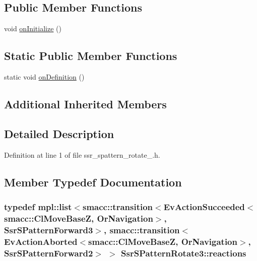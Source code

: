 \subsection*{Public Member Functions}
\begin{DoxyCompactItemize}
\item 
void \hyperlink{structSsrSPatternRotate3_a343a04a297e2b3801e4f7224fa6517a5}{on\+Initialize} ()
\end{DoxyCompactItemize}
\subsection*{Static Public Member Functions}
\begin{DoxyCompactItemize}
\item 
static void \hyperlink{structSsrSPatternRotate3_abd553dc366393f10fb622eb717b92f1b}{on\+Definition} ()
\end{DoxyCompactItemize}
\subsection*{Additional Inherited Members}


\subsection{Detailed Description}


Definition at line 1 of file ssr\+\_\+spattern\+\_\+rotate\+\_.\+h.



\subsection{Member Typedef Documentation}
\subsubsection[{\texorpdfstring{reactions}{reactions}}]{\setlength{\rightskip}{0pt plus 5cm}typedef mpl\+::list$<${\bf smacc\+::transition}$<$Ev\+Action\+Succeeded$<${\bf smacc\+::\+Cl\+Move\+BaseZ}, {\bf Or\+Navigation}$>$, {\bf Ssr\+S\+Pattern\+Forward3}$>$, {\bf smacc\+::transition}$<$Ev\+Action\+Aborted$<${\bf smacc\+::\+Cl\+Move\+BaseZ}, {\bf Or\+Navigation}$>$, {\bf Ssr\+S\+Pattern\+Forward2}$>$ $>$ {\bf Ssr\+S\+Pattern\+Rotate3\+::reactions}}\hypertarget{structSsrSPatternRotate3_a2a8df9f21e221d6dc03c8c2edc0ef8b3}{}\label{structSsrSPatternRotate3_a2a8df9f21e221d6dc03c8c2edc0ef8b3}


